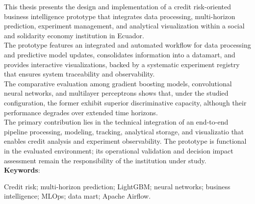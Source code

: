 This thesis presents the design and implementation of a credit risk-oriented business intelligence prototype that integrates data processing, multi-horizon prediction, experiment management, and analytical visualization within a social and solidarity economy institution in Ecuador.\\

The prototype features an integrated and automated workflow for data processing and predictive model updates, consolidates information into a datamart, and provides interactive visualizations, backed by a systematic experiment registry that ensures system traceability and observability.\\

The comparative evaluation among gradient boosting models, convolutional neural networks, and multilayer perceptrons shows that, under the studied configuration, the former exhibit superior discriminative capacity, although their performance degrades over extended time horizons.\\

The primary contribution lies in the technical integration of an end-to-end pipeline processing, modeling, tracking, analytical storage, and visualizatio that enables credit analysis and experiment observability. The prototype is functional in the evaluated environment; its operational validation and decision impact assessment remain the responsibility of the institution under study.\\

\noindent\textbf{Keywords}:

Credit risk; multi-horizon prediction; LightGBM; neural networks; business intelligence; MLOps; data mart; Apache Airflow.
